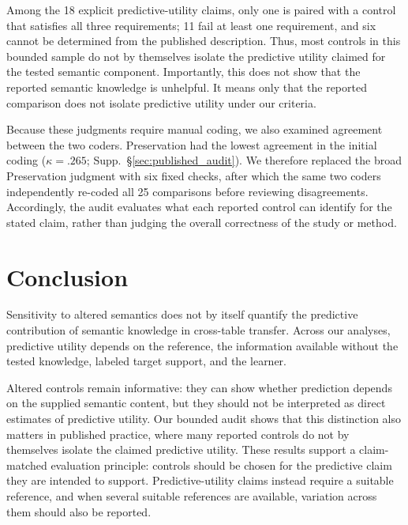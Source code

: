 \documentclass{article} %
\newcommand{\supp}[1]{\textnormal{Supp.~#1}}
\begin{document}
Among the 18 explicit predictive-utility claims, only one is paired with a control that satisfies all three requirements; 11 fail at least one requirement, and six cannot be determined from the published description.
Thus, most controls in this bounded sample do not by themselves isolate the predictive utility claimed for the tested semantic component.
Importantly, this does not show that the reported semantic knowledge is unhelpful.
It means only that the reported comparison does not isolate predictive utility under our criteria.

Because these judgments require manual coding, we also examined agreement between the two coders.
Preservation had the lowest agreement in the initial coding ($\kappa=.265$; \supp{\S\ref{sec:published_audit}}).
We therefore replaced the broad Preservation judgment with six fixed checks, after which the same two coders independently re-coded all 25 comparisons before reviewing disagreements.
Accordingly, the audit evaluates what each reported control can identify for the stated claim, rather than judging the overall correctness of the study or method.

\section{Conclusion}

Sensitivity to altered semantics does not by itself quantify the predictive contribution of semantic knowledge in cross-table transfer.
Across our analyses, predictive utility depends on the reference, the information available without the tested knowledge, labeled target support, and the learner.

Altered controls remain informative: they can show whether prediction depends on the supplied semantic content, but they should not be interpreted as direct estimates of predictive utility.
Our bounded audit shows that this distinction also matters in published practice, where many reported controls do not by themselves isolate the claimed predictive utility.
These results support a claim-matched evaluation principle: controls should be chosen for the predictive claim they are intended to support.
Predictive-utility claims instead require a suitable reference, and when several suitable references are available, variation across them should also be reported.
\end{document}
